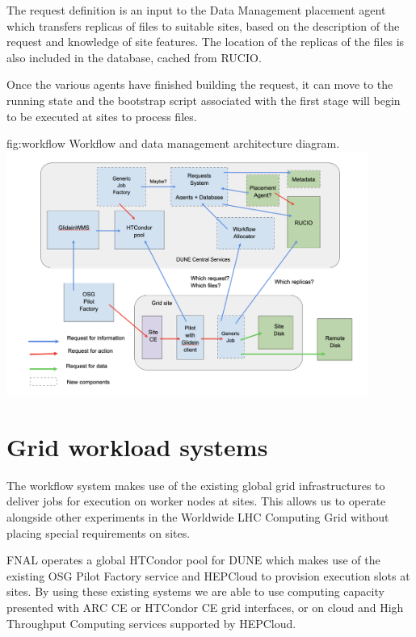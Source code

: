 \documentclass[../main-v1.tex]{subfiles}
\begin{document}
The request definition is an input to the Data Management placement agent which transfers replicas of files to suitable sites, based on the description of the request and knowledge of site features. The location of the replicas of the files is also included in the database, cached from RUCIO. 

Once the various agents have finished building the request, it can move to the running state and the bootstrap script associated with the first stage will begin to be executed at sites to process files.


\begin{dunefigure}
{fig:workflow} 
{Workflow and data management architecture diagram.}
\includegraphics[height=8cm]{graphics/Workflow/wfs.png}
\end{dunefigure}

\section{Grid workload systems}
\label{sec:flow:grid}

The workflow system makes use of the existing global grid infrastructures to deliver jobs for execution on worker nodes at sites. This allows us to operate alongside other experiments in the Worldwide LHC Computing Grid without placing special requirements on sites.

FNAL operates a global HTCondor pool for DUNE which makes use of the existing OSG Pilot Factory service and HEPCloud to provision execution slots at sites. By using these existing systems we are able to use computing capacity presented with ARC CE or HTCondor CE grid interfaces, or on cloud and High Throughput Computing services supported by HEPCloud.
\end{document}
